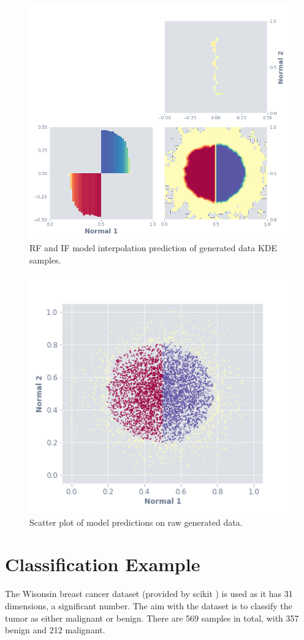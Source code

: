\documentclass[a4paper, twocolumn]{article}
\begin{document}
\begin{figure}
\centering
\includegraphics[width=0.8\columnwidth]{img/gen_rf_if.png}
\caption{RF and IF model interpolation prediction of generated data KDE samples.}
\label{fig:gen-rf-if}
\end{figure}

\begin{figure}
\centering
\includegraphics[width=0.6\columnwidth]{img/gen_scat.png}
\caption{Scatter plot of model predictions on raw generated data.}
\label{fig:gen-scat}
\end{figure}

\section{Classification Example}

The Wisonsin breast cancer dataset \cite{breastcancer} (provided by scikit \cite{pedregosa2011scikit}) is used as it has 31 dimensions, a significant number. The aim with the dataset is to classify the tumor as either malignant or benign. There are 569 samples in total, with 357 benign and 212 malignant.
\end{document}
